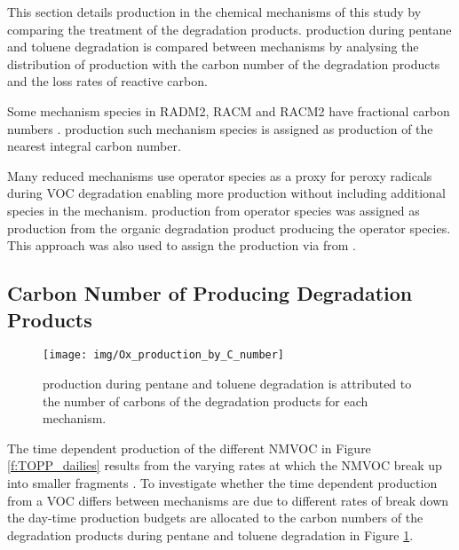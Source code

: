 
This section details  production in the chemical mechanisms of this study by comparing the treatment of the degradation products.
 production during pentane and toluene degradation is compared between mechanisms by analysing the distribution of  production with the carbon number of the degradation products and the loss rates of reactive carbon.

Some mechanism species in RADM2, RACM and RACM2 have fractional carbon numbers \citep{Stockwell:1990, Stockwell:1997, Goliff:2013}.
 production such mechanism species is assigned as  production of the nearest integral carbon number.

Many reduced mechanisms use operator species as a proxy for peroxy radicals during VOC degradation enabling more  production without including additional species in the mechanism.
 production from operator species was assigned as  production from the organic degradation product producing the operator species.
This approach was also used to assign the  production via  from .

\subsection[Carbon Number of Ox Producing Degradation Products]{Carbon Number of  Producing Degradation Products} \label{ss:c_number} %

\begin{figure}
    \centering
    \texttt{[image: img/Ox\_production\_by\_C\_number]}
    \vspace{0mm}
    \caption{ production during pentane and toluene degradation is attributed to the number of carbons of the degradation products for each mechanism.}
    \vspace{-4mm}
    \label{f:carbon}
\end{figure}

The time dependent  production of the different NMVOC in Figure \ref{f:TOPP_dailies} results from the varying rates at which the NMVOC break up into smaller fragments \citep{Butler:2011}.
To investigate whether the time dependent  production from a VOC differs between mechanisms are due to different rates of break down the day-time  production budgets are allocated to the carbon numbers of the degradation products during pentane and toluene degradation in Figure \ref{f:carbon}.  

